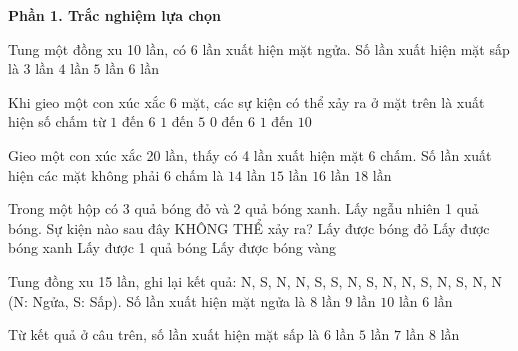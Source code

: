 \textbf{Phần 1. Trắc nghiệm lựa chọn}

\begin{ex} %
Tung một đồng xu 10 lần, có 6 lần xuất hiện mặt ngửa. Số lần xuất hiện mặt sấp là
\choice
{$3$ lần}
{\True $4$ lần}
{$5$ lần}
{$6$ lần}
\end{ex}

\begin{ex} %
Khi gieo một con xúc xắc 6 mặt, các sự kiện có thể xảy ra ở mặt trên là xuất hiện số chấm từ
\choice
{\True $1$ đến $6$}
{$1$ đến $5$}
{$0$ đến $6$}
{$1$ đến $10$}
\end{ex}

\begin{ex} %
Gieo một con xúc xắc 20 lần, thấy có 4 lần xuất hiện mặt 6 chấm. Số lần xuất hiện các mặt không phải 6 chấm là
\choice
{$14$ lần}
{$15$ lần}
{\True $16$ lần}
{$18$ lần}
\end{ex}

\begin{ex} %
Trong một hộp có 3 quả bóng đỏ và 2 quả bóng xanh. Lấy ngẫu nhiên 1 quả bóng. Sự kiện nào sau đây KHÔNG THỂ xảy ra?
\choice
{Lấy được bóng đỏ}
{Lấy được bóng xanh}
{Lấy được 1 quả bóng}
{\True Lấy được bóng vàng}
\end{ex}

\begin{ex} %
Tung đồng xu 15 lần, ghi lại kết quả: N, S, N, N, S, S, N, S, N, N, S, N, S, N, N (N: Ngửa, S: Sấp). Số lần xuất hiện mặt ngửa là
\choice
{$8$ lần}
{\True $9$ lần}
{$10$ lần}
{$6$ lần}
\end{ex}

\begin{ex} %
Từ kết quả ở câu trên, số lần xuất hiện mặt sấp là
\choice
{\True $6$ lần}
{$5$ lần}
{$7$ lần}
{$8$ lần}
\end{ex}


